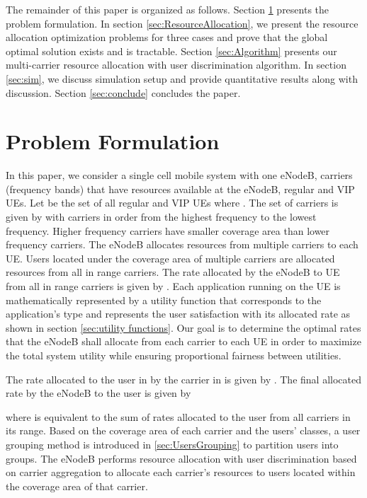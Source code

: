\documentclass[journal]{IEEEtran} 				\IEEEoverridecommandlockouts 						\usepackage{amsmath,amssymb}
\begin{document}
The remainder of this paper is organized as follows. Section \ref{sec:Problem_formulation} presents the problem formulation. In section \ref{sec:ResourceAllocation}, we present the resource allocation optimization problems for three cases and prove that the global optimal solution exists and is tractable. Section \ref{sec:Algorithm} presents our multi-carrier resource allocation with user discrimination algorithm. In section \ref{sec:sim}, we discuss simulation setup and provide quantitative results along with discussion. Section \ref{sec:conclude} concludes the paper.
\section{Problem Formulation}\label{sec:Problem_formulation}
In this paper, we consider a single cell mobile system with one eNodeB,  carriers (frequency bands) that have resources available at the eNodeB,  regular and VIP UEs. Let  be the set of all regular and VIP UEs where . The set of carriers is given by  with carriers in order from the highest frequency to the lowest frequency. Higher frequency carriers have smaller coverage area than lower frequency carriers. The eNodeB allocates resources from multiple carriers to each UE. Users located under the coverage area of multiple carriers are allocated resources from all in range carriers.
The rate allocated by the eNodeB to UE  from all in range carriers is given by . Each application running on the UE is mathematically represented by a utility function  that corresponds to the application's type and represents the user satisfaction with its allocated rate  as shown in section \ref{sec:utility functions}. Our goal is to determine the optimal rates that the eNodeB shall allocate from each carrier to each UE in order to maximize the total system utility while ensuring proportional fairness between utilities.

The rate allocated to the  user in  by the  carrier in  is given by . The final allocated rate by the eNodeB to the  user is given by

where  is equivalent to the sum of rates allocated to the  user from all carriers in its range. Based on the coverage area of each carrier and the users' classes, a user grouping method is introduced in \ref{sec:UsersGrouping} to partition users into groups. The eNodeB performs resource allocation with user discrimination based on carrier aggregation to allocate each carrier's resources to users located within the coverage area of that carrier.
\end{document}
